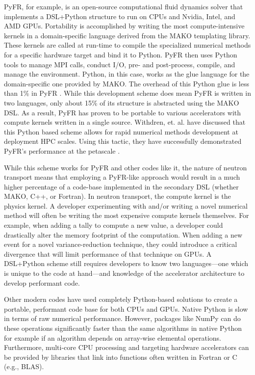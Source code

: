 PyFR, for example, is an open-source computational fluid dynamics solver that implements a DSL+Python structure \cite{witherden_pyfr_2014} to run on CPUs and Nvidia, Intel, and AMD GPUs. 
Portability is accomplished by writing the most compute-intensive kernels in a domain-specific language derived from the MAKO templating library. 
These kernels are called at run-time to compile the specialized numerical methods for a specific hardware target and bind it to Python. 
PyFR then uses Python tools to manage MPI calls, conduct I/O, pre- and post-process, compile, and manage the environment. 
Python, in this case, works as the glue language for the domain-specific one provided by MAKO. 
The overhead of this Python glue is less than 1\% in PyFR \cite{PyFR1p}.
While this development scheme does mean PyFR is written in two languages, only about 15\% of its structure is abstracted using the MAKO DSL.
As a result, PyFR has proven to be portable to various accelerators with compute kernels written in a single source. 
Withdren, et. al. \cite{pyfrPetascale} have discussed that this Python based scheme allows for rapid numerical methods development at deployment HPC scales. 
Using this tactic, they have successfully demonstrated PyFR's performance at the petascale \cite{pyfrPetascale}.

While this scheme works for PyFR and other codes like it, the nature of neutron transport means that employing a PyFR-like approach would result in a much higher percentage of a code-base implemented in the secondary DSL (whether MAKO, C++, or Fortran). 
In neutron transport, the compute kernel is the physics kernel.
A developer experimenting with and/or writing a novel numerical method will often be writing the most expensive compute kernels themselves. 
For example, when adding a tally to compute a new value, a developer could drastically alter the memory footprint of the computation. 
When adding a new event for a novel variance-reduction technique, they could introduce a critical divergence that will limit performance of that technique on GPUs. 
A DSL+Python scheme still requires developers to know two languages---one which is unique to the code at hand---and knowledge of the accelerator architecture to develop performant code.

Other modern codes have used completely Python-based solutions to create a portable, performant code base for both CPUs and GPUs.
Native Python is slow in terms of raw numerical performance.
However, packages like NumPy \cite{van_der_walt_numpy_2011} can do these operations significantly faster than the same algorithms in native Python for example if an algorithm depends on array-wise elemental operations.
Furthermore, multi-core CPU processing and targeting hardware accelerators can be provided by libraries that link into functions often written in Fortran or C (e.g., BLAS).

